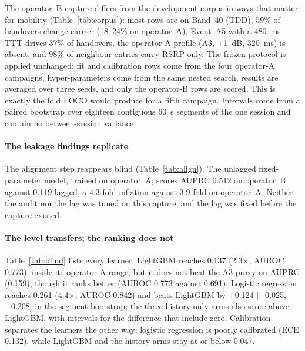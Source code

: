\documentclass[5p,times,twocolumn]{elsarticle}
\newcommand{\x}{$\times$}
\begin{document}
The operator~B capture differs from the development corpus in ways that matter for mobility (Table~\ref{tab:corpus}): most rows are on Band~40 (TDD), 59\% of handovers change carrier (18--24\% on operator~A), Event~A5 with a 480~ms TTT drives 37\% of handovers, the operator-A profile (A3, +1~dB, 320~ms) is absent, and 98\% of neighbour entries carry RSRP only. The frozen protocol is applied unchanged: fit and calibration rows come from the four operator-A campaigns, hyper-parameters come from the same nested search, results are averaged over three seeds, and only the operator-B rows are scored. This is exactly the fold LOCO would produce for a fifth campaign. Intervals come from a paired bootstrap over eighteen contiguous 60~s segments of the one session and contain no between-session variance.

\paragraph{The leakage findings replicate} The alignment step reappears blind (Table~\ref{tab:align}). The unlagged fixed-parameter model, trained on operator~A, scores AUPRC 0.512 on operator~B against 0.119 lagged, a 4.3-fold inflation against 3.9-fold on operator~A. Neither the audit nor the lag was tuned on this capture, and the lag was fixed before the capture existed.

\paragraph{The level transfers; the ranking does not} Table~\ref{tab:blind} lists every learner. LightGBM reaches 0.137 (2.3\x, AUROC 0.773), inside its operator-A range, but it does not beat the A3 proxy on AUPRC (0.159), though it ranks better (AUROC 0.773 against 0.691). Logistic regression reaches 0.261 (4.4\x, AUROC 0.842) and beats LightGBM by +0.124 [+0.025, +0.208] in the segment bootstrap; the three history-only arms also score above LightGBM, with intervals for the difference that include zero. Calibration separates the learners the other way: logistic regression is poorly calibrated (ECE 0.132), while LightGBM and the history arms stay at or below 0.047.
\end{document}
